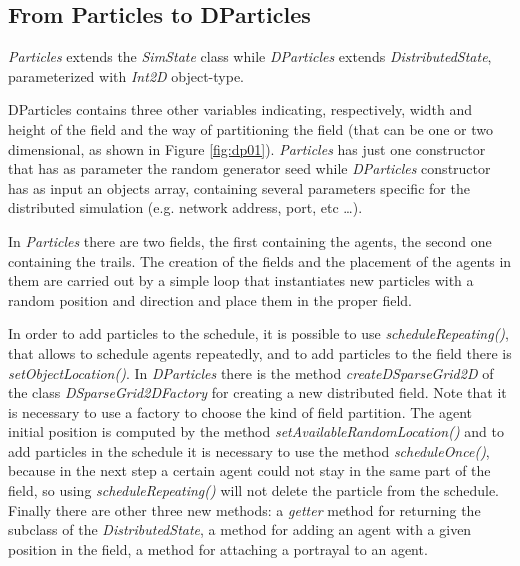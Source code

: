 \documentclass[12pt]{article}
\begin{document}
\subsection{From Particles to DParticles}
\textit{Particles} extends the \textit{SimState} class  while \textit{DParticles} extends \textit{DistributedState}, parameterized with \textit{Int2D} object-type.

DParticles contains three other variables indicating, respectively, width and height of the field and the way of partitioning the field (that can be one or two dimensional, as shown in Figure \ref{fig:dp01}). \textit{Particles} has just one constructor that has as parameter the random generator seed while \textit{DParticles} constructor has as input an objects array, containing several parameters specific for the distributed simulation (e.g. network address, port, etc \ldots). 

In \textit{Particles} there are two fields, the first containing the agents, the second one containing the trails. The creation of the fields and the placement of the agents in them are carried out by a simple loop that instantiates new particles with a random position and direction and place them in the proper field. 

In order to add particles to the schedule, it is possible to use \textit{scheduleRepeating()}, that allows to schedule agents repeatedly, and to add particles to the field there is \textit{setObjectLocation()}. In \textit{DParticles} there is the method \textit{createDSparseGrid2D} of the class \textit{DSparseGrid2DFactory} for creating a new distributed field. Note that it is necessary to use a factory to choose the kind of field partition. The agent initial position is computed by the method \textit{setAvailableRandomLocation()} and to add particles in the schedule it is necessary to use the method \textit{scheduleOnce()}, because in the next step a certain agent could not stay in the same part of the field, so using \textit{scheduleRepeating()} will not delete the particle from the schedule. Finally there are other three new methods: a \textit{getter} method for returning the subclass of the \textit{DistributedState}, a method for adding an agent with a given position in the field, a method for attaching a portrayal to an agent.
\end{document}
